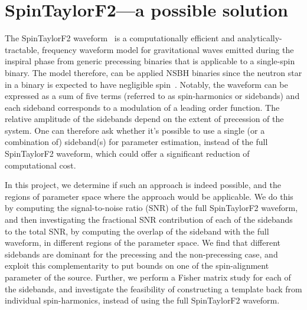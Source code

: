 \section{SpinTaylorF2---a possible solution}

The SpinTaylorF2 waveform~\cite{Lundgren2014} is a computationally efficient
and analytically-tractable, frequency waveform model for gravitational waves
emitted during the inspiral phase from generic precessing binaries that is
applicable to a single-spin binary. The model therefore, can be applied NSBH
binaries since the neutron star in a binary is expected to have negligible
spin~\cite{Brown2012, Kramer}. Notably, the waveform can be
expressed as a sum of five terms (referred to as spin-harmonics or sidebands)
and each sideband corresponds to a modulation of a leading order function. The
relative amplitude of the sidebands depend on the extent of precession of the
system. One can therefore ask whether it's possible to use a single (or a
combination of) sideband(s) for parameter estimation, instead of the full
SpinTaylorF2 waveform, which could offer a significant reduction of
computational cost.

In this project, we determine if such an approach is indeed possible, and the
regions of  parameter space where the approach would be applicable. We do this
by computing the signal-to-noise ratio (SNR) of the full SpinTaylorF2
waveform, and then investigating the fractional SNR contribution of each of
the sidebands to the total SNR, by computing the overlap of
the sideband with the full waveform, in different regions of the parameter
space. We find that different sidebands are dominant for the precessing and
the non-precessing case, and exploit this complementarity to put bounds on one
of the spin-alignment parameter of the source. Further, we perform a Fisher
matrix study for each of the sidebands, and investigate the
feasibility of constructing a template back from individual spin-harmonics,
instead of using the full SpinTaylorF2 waveform.
